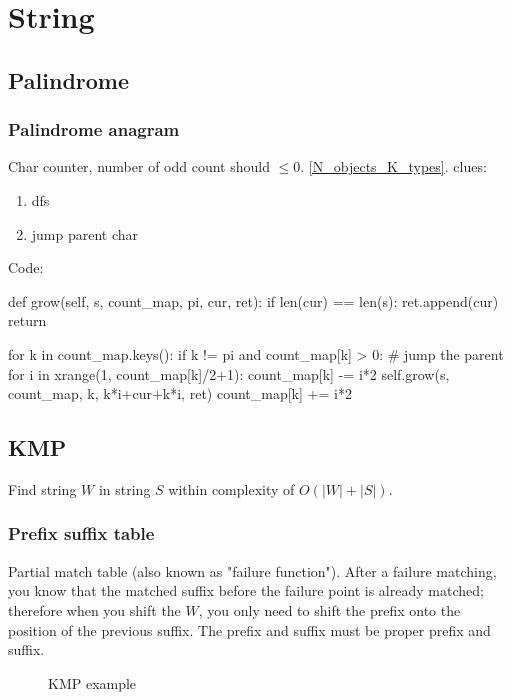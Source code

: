 \chapter{String}

\section{Palindrome}
\subsection{Palindrome anagram}
 Char counter, number of odd count should $\leq 0$.
 \ref{N_objects_K_types}.
 clues:
\begin{enumerate}
\item dfs
\item jump parent char
\end{enumerate}
Code:
\begin{python}
def grow(self, s, count_map, pi, cur, ret):
  if len(cur) == len(s):
    ret.append(cur)
    return

  for k in count_map.keys():
    if k != pi and count_map[k] > 0:
      # jump the parent
      for i in xrange(1, count_map[k]/2+1):
        count_map[k] -= i*2
        self.grow(s, count_map, k, k*i+cur+k*i, ret)
        count_map[k] += i*2

\end{python}


\section{KMP}
Find string $W$ in string $S$ within complexity of $O(|W|+|S|)$.
\subsection{Prefix suffix table}
Partial match table (also known as "failure function"). After a failure matching, you know that the matched suffix before the failure point is already matched; therefore when you shift the $W$, you only need to shift the prefix onto the position of the previous suffix. The prefix and suffix must be proper prefix and suffix.
\begin{figure}[hbtp]
\centering
{}
\caption{KMP example}
\label{fig:kmp_presuffix}
\end{figure}

